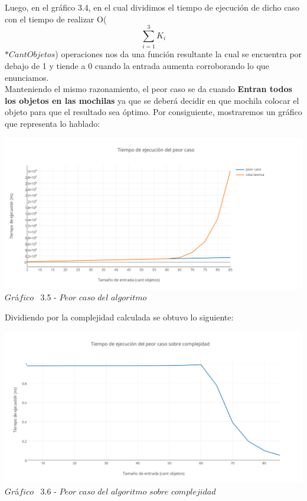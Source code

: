 Luego, en el gr\'afico 3.4, en el cual dividimos el tiempo de ejecuci\'on de dicho caso con el tiempo de realizar O(\[
\sum_{i=1}^{3}K_{i} 
\] $\ast CantObjetos$) operaciones nos da una funci\'on resultante la cual se encuentra por debajo de 1 y tiende a 0 cuando la entrada aumenta corroborando lo que enunciamos.\\

Manteniendo el mismo razonamiento, el peor caso se da cuando \textbf{Entran todos los objetos en las mochilas} ya que se deber\'a decidir en que mochila colocar el objeto para que el resultado sea \'optimo. Por consiguiente, mostraremos un gr\'afico que representa lo hablado:\\

\vspace*{0.3cm} \vspace*{0.3cm}
  \begin{center}
 \includegraphics[scale=0.65]{./EJ3/peorcaso.png}
 {$Gr$\'a$fico$ \ 3.5 - $Peor$ $caso$ $del$ $algoritmo$}
  \end{center}
  \vspace*{0.3cm}

Dividiendo por la complejidad calculada se obtuvo lo siguiente:\\

\vspace*{0.3cm} \vspace*{0.3cm}
  \begin{center}
 \includegraphics[scale=0.65]{./EJ3/peorcaso1.png}
 {$Gr$\'a$fico$ \ 3.6 - $Peor$ $caso$ $del$ $algoritmo$ $sobre$ $complejidad$}
  \end{center}
  \vspace*{0.3cm}
  
